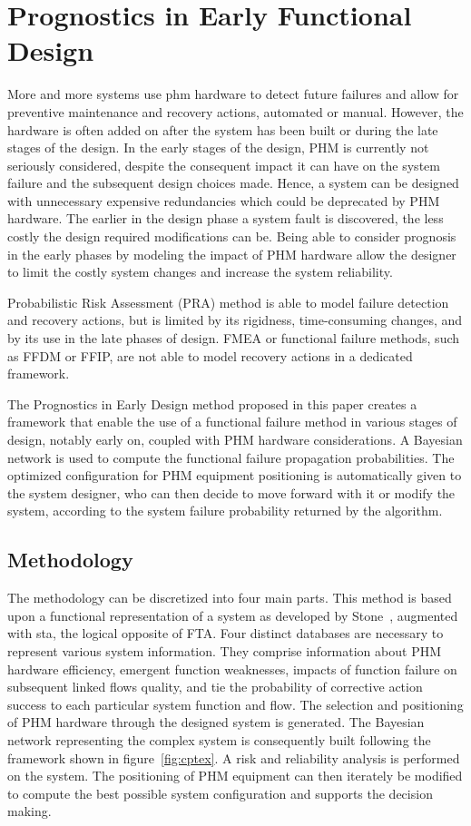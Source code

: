 \section{Prognostics in Early Functional Design}
\label{chap:pfed}

More and more systems use \gls{phm} hardware to detect future failures and allow for preventive maintenance and recovery actions, automated or manual. However, the hardware is often added on after the system has been built or during the late stages of the design. In the early stages of the design, PHM is currently not seriously considered, despite the consequent impact it can have on the system failure and the subsequent design choices made. Hence, a system can be designed with unnecessary expensive redundancies which could be deprecated by PHM hardware. The earlier in the design phase a system fault is discovered, the less costly the design required modifications can be. Being able to consider prognosis in the early phases by modeling the impact of PHM hardware allow the designer to limit the costly system changes and increase the system reliability.

Probabilistic Risk Assessment (PRA) method is able to model failure detection and recovery actions, but is limited by its rigidness, time-consuming changes, and by its use in the late phases of design. FMEA or functional failure methods, such as FFDM or FFIP, are not able to model recovery actions in a dedicated framework.

The Prognostics in Early Design method proposed in this paper creates a framework that enable the use of a functional failure method in various stages of design, notably early on, coupled with PHM hardware considerations. A Bayesian network is used to compute the functional failure propagation probabilities. The optimized configuration for PHM equipment positioning is automatically given to the system designer, 
who can then decide to move forward with it or modify the system, according to the system failure probability returned by the algorithm.


\subsection{Methodology}

The methodology can be discretized into four main parts. This method is based upon a functional representation of a system as developed by Stone~\cite{stone}, augmented with \gls{sta}, the logical opposite of FTA. Four distinct databases are necessary to represent various system information. They comprise information about PHM hardware efficiency, emergent function weaknesses, impacts of function failure on subsequent linked flows quality, and tie the probability of corrective action success to each particular system function and flow. The selection and positioning of PHM hardware through the designed system is generated. The Bayesian network representing the complex system is consequently built following the framework shown in figure~\ref{fig:cptex}. A risk and reliability analysis is performed on the system. The positioning of PHM equipment can then iterately be modified to compute the best possible system configuration and supports the decision making.


